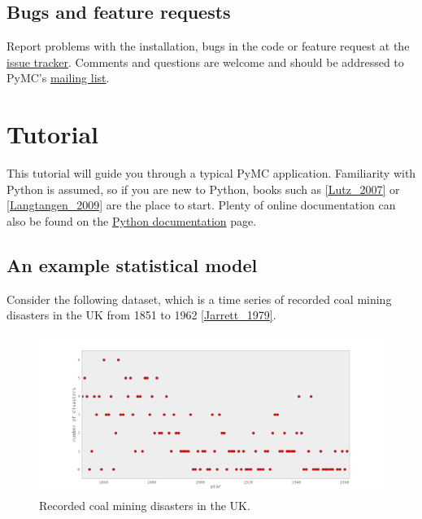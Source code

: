 \documentclass[letterpaper,10pt,english]{sphinxmanual}
\begin{document}
\section{Bugs and feature requests}
\label{INSTALL:nose}\label{INSTALL:bugs-and-feature-requests}
Report problems with the installation, bugs in the code or feature request at
the \href{http://code.google.com/p/pymc/issues/list}{issue tracker}. Comments and questions are welcome and should be
addressed to PyMC's \href{mailto:pymc@googlegroups.com}{mailing list}.


\chapter{Tutorial}
\label{tutorial:mailing-list}\label{tutorial::doc}\label{tutorial:tutorial}
This tutorial will guide you through a typical PyMC application. Familiarity with Python is assumed, so if you are new to Python, books such as {\hyperref[references:lutz-2007]{{[}Lutz\_2007{]}}} or {\hyperref[references:langtangen-2009]{{[}Langtangen\_2009{]}}} are the place to start. Plenty of online documentation can also be found on the \href{http://www.python.org/doc/}{Python documentation} page.


\section{An example statistical model}
\label{tutorial:an-example-statistical-model}
Consider the following dataset, which is a time series of recorded coal mining disasters in the UK from 1851 to 1962 {\hyperref[references:jarrett-1979]{{[}Jarrett\_1979{]}}}.
\begin{figure}[htbp]
\centering
\capstart

\includegraphics{disasterts.pdf}
\caption{Recorded coal mining disasters in the UK.}\label{tutorial:disasters-figure}\end{figure}
\end{document}
